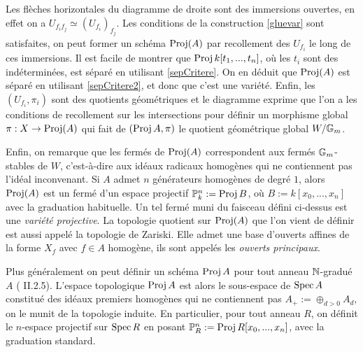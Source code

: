 Les flèches horizontales du diagramme de droite sont des immersions ouvertes, en effet on a $U_{f_if_j}\simeq (U_{f_i})_{f_j}$. Les conditions de la construction \ref{gluevar} sont satisfaites, on peut former un schéma $\operatorname{Proj}(A)$ par recollement des $U_{f_i}$ le long de ces immersions. Il est facile de montrer que $\operatorname{Proj} k[t_1,...,t_n]$, où les $t_i$ sont des indéterminées, est séparé en utilisant \ref{sepCritere}. On en déduit que $\operatorname{Proj}(A)$ est séparé en utilisant \ref{sepCritere2}, et donc que c'est une variété. Enfin, les $(U_{f_i},\pi_i)$ sont des quotients géométriques et le diagramme exprime que l'on a les conditions de recollement sur les intersections pour définir un morphisme global $\pi:X\rightarrow\operatorname{Proj}(A)$ qui fait de $(\operatorname{Proj} A,\pi)$ le quotient géométrique global $W/\mathbb{G}_m$. 

Enfin, on remarque que les fermés de $\operatorname{Proj}(A)$ correspondent aux fermés $\mathbb{G}_m$-stables de $W$, c'est-à-dire aux idéaux radicaux homogènes qui ne contiennent pas l'idéal inconvenant. Si $A$ admet $n$ générateurs homogènes de degré $1$, alors $\operatorname{Proj}(A)$ est un fermé d'un espace projectif $\mathbb{P}^n_k:=\operatorname{Proj} B$, où $B:=k[x_0,...,x_n]$ avec la graduation habituelle. Un tel fermé muni du faisceau défini ci-dessus  est une \textit{variété projective}. La topologie quotient sur $\operatorname{Proj}(A)$ que l'on vient de définir est aussi appelé la topologie de Zariski. Elle admet une base d'ouverts affines de la forme $X_f$ avec $f\in A$ homogène, ils sont appelés les \textit{ouverts principaux}.


\begin{rem}
Plus généralement on peut définir un schéma $\operatorname{Proj} A$ pour tout anneau $\mathbb{N}$-gradué $A$ (\cite{Hartshorne} II.2.5). L'espace topologique $\operatorname{Proj} A$ est alors le sous-espace de $\operatorname{Spec} A$ constitué des idéaux premiers homogènes qui ne contiennent pas $A_+:=\oplus_{d>0}A_d$, on le munit de la topologie induite. En particulier, pour tout anneau $R$, on définit le $n$-espace projectif sur $\operatorname{Spec} R$ en posant $\mathbb{P}^n_R:=\operatorname{Proj} R[x_0,...,x_n]$, avec la graduation standard.
\end{rem}
